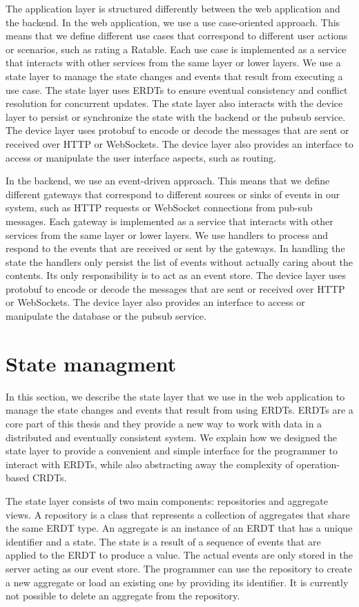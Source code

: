 \documentclass[
	ngerman,
	ruledheaders=section,   %
	class=report,		    %
	thesis={type=bachelor}, %
	accentcolor=9c,			%
	custommargins=true,    %
	marginpar=false,        %
	parskip=half-,          %
	fontsize=11pt,          %
]{tudapub}
\begin{document}
The application layer is structured differently between the web application and the backend. In the web application, we use a use case-oriented approach. This means that we define different use cases that correspond to different user actions or scenarios, such as rating a Ratable. Each use case is implemented as a service that interacts with other services from the same layer or lower layers. We use a state layer to manage the state changes and events that result from executing a use case. The state layer uses ERDTs to ensure eventual consistency and conflict resolution for concurrent updates. The state layer also interacts with the device layer to persist or synchronize the state with the backend or the pubsub service. The device layer uses protobuf to encode or decode the messages that are sent or received over HTTP or WebSockets. The device layer also provides an interface to access or manipulate the user interface aspects, such as routing.

In the backend, we use an event-driven approach. This means that we define different gateways that correspond to different sources or sinks of events in our system, such as HTTP requests or WebSocket connections from pub-sub messages. Each gateway is implemented as a service that interacts with other services from the same layer or lower layers. We use handlers to process and respond to the events that are received or sent by the gateways. In handling the state the handlers only persist the list of events without actually caring about the contents. Its only responsibility is to act as an event store. The device layer uses protobuf to encode or decode the messages that are sent or received over HTTP or WebSockets. The device layer also provides an interface to access or manipulate the database or the pubsub service.

\section{State managment}
In this section, we describe the state layer that we use in the web application to manage the state changes and events that result from using ERDTs. ERDTs are a core part of this thesis and they provide a new way to work with data in a distributed and eventually consistent system. We explain how we designed the state layer to provide a convenient and simple interface for the programmer to interact with ERDTs, while also abstracting away the complexity of operation-based CRDTs.

The state layer consists of two main components: repositories and aggregate views. A repository is a class that represents a collection of aggregates that share the same ERDT type. An aggregate is an instance of an ERDT that has a unique identifier and a state. The state is a result of a sequence of events that are applied to the ERDT to produce a value. The actual events are only stored in the server acting as our event store. The programmer can use the repository to create a new aggregate or load an existing one by providing its identifier. It is currently not possible to delete an aggregate from the repository.
\end{document}
